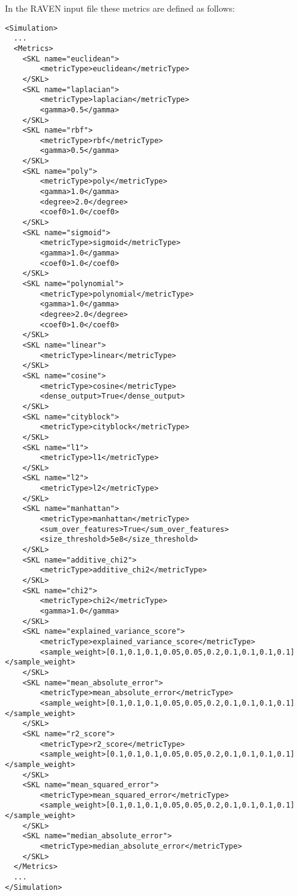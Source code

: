 In the RAVEN input file these metrics are defined as follows:
\begin{lstlisting}[style=XML]
<Simulation>
  ...
  <Metrics>
    <SKL name="euclidean">
        <metricType>euclidean</metricType>
    </SKL>
    <SKL name="laplacian">
        <metricType>laplacian</metricType>
        <gamma>0.5</gamma>
    </SKL>
    <SKL name="rbf">
        <metricType>rbf</metricType>
        <gamma>0.5</gamma>
    </SKL>
    <SKL name="poly">
        <metricType>poly</metricType>
        <gamma>1.0</gamma>
        <degree>2.0</degree>
        <coef0>1.0</coef0>
    </SKL>
    <SKL name="sigmoid">
        <metricType>sigmoid</metricType>
        <gamma>1.0</gamma>
        <coef0>1.0</coef0>
    </SKL>
    <SKL name="polynomial">
        <metricType>polynomial</metricType>
        <gamma>1.0</gamma>
        <degree>2.0</degree>
        <coef0>1.0</coef0>
    </SKL>
    <SKL name="linear">
        <metricType>linear</metricType>
    </SKL>
    <SKL name="cosine">
        <metricType>cosine</metricType>
        <dense_output>True</dense_output>
    </SKL>
    <SKL name="cityblock">
        <metricType>cityblock</metricType>
    </SKL>
    <SKL name="l1">
        <metricType>l1</metricType>
    </SKL>
    <SKL name="l2">
        <metricType>l2</metricType>
    </SKL>
    <SKL name="manhattan">
        <metricType>manhattan</metricType>
        <sum_over_features>True</sum_over_features>
        <size_threshold>5e8</size_threshold>
    </SKL>
    <SKL name="additive_chi2">
        <metricType>additive_chi2</metricType>
    </SKL>
    <SKL name="chi2">
        <metricType>chi2</metricType>
        <gamma>1.0</gamma>
    </SKL>
    <SKL name="explained_variance_score">
        <metricType>explained_variance_score</metricType>
        <sample_weight>[0.1,0.1,0.1,0.05,0.05,0.2,0.1,0.1,0.1,0.1]</sample_weight>
    </SKL>
    <SKL name="mean_absolute_error">
        <metricType>mean_absolute_error</metricType>
        <sample_weight>[0.1,0.1,0.1,0.05,0.05,0.2,0.1,0.1,0.1,0.1]</sample_weight>
    </SKL>
    <SKL name="r2_score">
        <metricType>r2_score</metricType>
        <sample_weight>[0.1,0.1,0.1,0.05,0.05,0.2,0.1,0.1,0.1,0.1]</sample_weight>
    </SKL>
    <SKL name="mean_squared_error">
        <metricType>mean_squared_error</metricType>
        <sample_weight>[0.1,0.1,0.1,0.05,0.05,0.2,0.1,0.1,0.1,0.1]</sample_weight>
    </SKL>
    <SKL name="median_absolute_error">
        <metricType>median_absolute_error</metricType>
    </SKL>
  </Metrics>
  ...
</Simulation>
\end{lstlisting}

